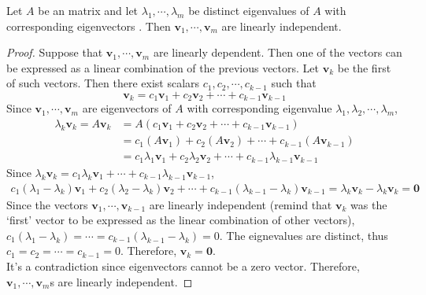 \begin{theorem}
	Let $ A $ be an \nbyn matrix and let $\lambda_1, \cdots, \lambda_m$ be distinct eigenvalues of $ A $ with corresponding eigenvectors \vm. Then $\textbf{v}_1, \cdots, \textbf{v}_m$ are linearly independent.
\end{theorem}
\begin{proof}
	Suppose that $\textbf{v}_1, \cdots, \textbf{v}_m$ are linearly dependent. Then one of the vectors can be expressed as a linear combination of the previous vectors. Let $\textbf{v}_{k}$ be the first of such vectors. Then there exist scalars $c_1, c_2, \cdots, c_{k-1}$ such that \begin{equation*}
		\textbf{v}_{k} = c_1\textbf{v}_1 + c_2\textbf{v}_2 + \cdots + c_{k-1}\textbf{v}_{k-1}
	\end{equation*}
	Since $\textbf{v}_1, \cdots, \textbf{v}_m$ are eigenvectors of $A$ with corresponding eigenvalue $\lambda_1, \lambda_2, \cdots, \lambda_{m}$, \begin{align*}
		\lambda_{k}\textbf{v}_{k} = A\textbf{v}_{k} &= A(c_1\textbf{v}_1 + c_2\textbf{v}_2 + \cdots + c_{k-1}\textbf{v}_{k-1}) \\
		&= c_1(A\textbf{v}_1) + c_2(A\textbf{v}_2) + \cdots + c_{k-1}(A\textbf{v}_{k-1}) \\
		&= c_1\lambda_1\textbf{v}_1 + c_2\lambda_2\textbf{v}_2 + \cdots + c_{k-1}\lambda_{k-1}\textbf{v}_{k-1}
	\end{align*}
	Since $\lambda_{k}\textbf{v}_k = c_1\lambda_{k}\textbf{v}_1 + \cdots + c_{k-1}\lambda_{k-1}\textbf{v}_{k-1}$, \begin{align*}
		c_1(\lambda_1 - \lambda_k)\textbf{v}_1 + c_2(\lambda_2 - \lambda_k)\textbf{v}_2 + \cdots + c_{k-1}(\lambda_{k-1} - \lambda_k)\textbf{v}_{k-1} = \lambda_k\textbf{v}_k - \lambda_k\textbf{v}_k = \textbf{0}
	\end{align*}
	Since the vectors $\textbf{v}_1, \cdots, \textbf{v}_{k-1}$ are linearly independent (remind that $\textbf{v}_k$ was the `first' vector to be expressed as the linear combination of other vectors), $c_1(\lambda_1 - \lambda_k) = \cdots = c_{k-1}(\lambda_{k-1} - \lambda_k) = 0$. The eignevalues are distinct, thus $c_1 = c_2 = \cdots = c_{k-1} = 0$. Therefore, $\textbf{v}_k = \textbf{0}$. \\
	
	It's a contradiction since eigenvectors cannot be a zero vector. Therefore, $\textbf{v}_1, \cdots, \textbf{v}_m$s are linearly independent.
\end{proof}

